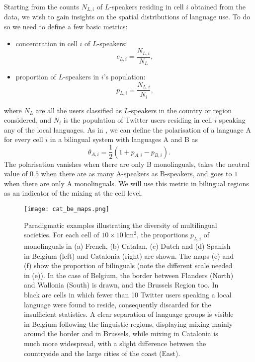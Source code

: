 \documentclass[../thesis.tex]{subfiles}
\begin{document}
Starting from the counts $N_{L,i}$ of $L$-speakers residing in cell $i$ obtained from
the data, we wish to gain insights on the spatial distributions of language use. To do
so we need to define a few basic metrics:
\begin{itemize}
       \item concentration in cell $i$ of $L$-speakers:
       \begin{equation}
       \label{eq:def_conc}
              c_{L,i} = \frac{N_{L,i}}{N_L},
       \end{equation}
       \item proportion of $L$-speakers in $i$'s population:
       \begin{equation}
       \label{eq:def_prop}
              p_{L,i} = \frac{N_{L,i}}{N_i},
       \end{equation}
\end{itemize}
where $N_L$ are all the users classified as $L$-speakers in the country or region
considered, and $N_i$ is the population of Twitter users residing in cell $i$ speaking
any of the local languages. As in \cite{MocanuTwitterBabel2013}, we can define the
polarisation of a language A for every cell $i$ in a bilingual system with languages A
and B as 
\begin{equation}
\label{eq:def_polar}
    \theta_{A, i} = \frac{1}{2} (1 + p_{A,i} - p_{B,i}). 
\end{equation}
The polarisation vanishes when there are only B monolinguals, takes the neutral value of
$0.5$ when there are as many A-speakers as B-speakers, and goes to $1$ when there are
only A monolinguals. We will use this metric in bilingual regions as an indicator of the
mixing at the cell level. 

\begin{figure*}[p!]
  \centering
  \texttt{[image: cat\_be\_maps.png]}
  \caption{Paradigmatic examples illustrating the diversity of multilingual societies.
  For each cell of $10 \times 10 \, \si{\kilo \meter \squared}$, the proportions
  $p_{L,i}$ of monolinguals in (a) French, (b) Catalan, (c) Dutch and (d) Spanish in
  Belgium (left) and Catalonia (right) are shown. The maps (e) and (f) show the
  proportion of bilinguals (note the different scale needed in (e)). In the case of
  Belgium, the border between Flanders (North) and Wallonia (South) is drawn, and the
  Brussels Region too. In black are cells in which fewer than 10 Twitter users speaking
  a local language were found to reside, consequently discarded for the insufficient
  statistics. A clear separation of language groups is visible in Belgium following the
  linguistic regions, displaying mixing mainly around the border and in Brussels, while
  mixing in Catalonia is much more widespread, with a slight difference between the
  countryside and the large cities of the coast (East).}
  \label{fig:cat_be_maps}
\end{figure*}
\end{document}
